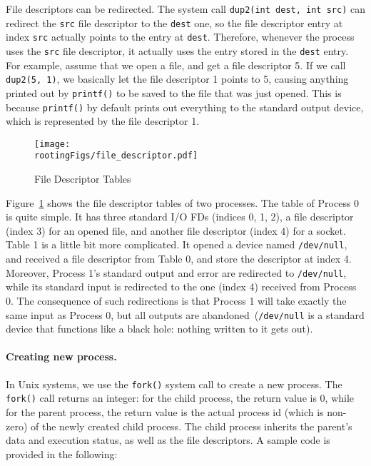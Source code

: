 File descriptors can be redirected. The system call \texttt{dup2(int dest, int src)} can 
redirect the \texttt{src} file descriptor to the \texttt{dest} one, so the file descriptor entry at index
\texttt{src} actually points to the entry at \texttt{dest}. Therefore, whenever   
the process uses the \texttt{src} file descriptor, it actually uses the entry stored in 
the \texttt{dest} entry. For example, assume that we open a file, and get a file descriptor 5. 
If we call \texttt{dup2(5, 1)}, we basically let the file descriptor 1 points to 5, causing 
anything printed out by \texttt{printf()} to be saved to the file that was just opened. This is
because \texttt{printf()} by default prints out everything to the standard output device, which
is represented by the file descriptor 1. 


\begin{figure}[htb]
  \begin{center}
    \texttt{[image: \\rootingFigs/file\_descriptor.pdf]}
  \end{center}
  \caption{File Descriptor Tables}
  \label{fig:rooting:FDTables}
\end{figure}
 

Figure~\ref{fig:rooting:FDTables} shows the file descriptor tables of two processes.
The table of Process 0 is quite simple. It has three
standard I/O FDs (indices 0, 1, 2), a file descriptor (index 3) for an opened file, and 
another file descriptor (index 4) for a socket.
Table 1 is a little bit more complicated. It opened a device named \texttt{/dev/null}, and received a 
file descriptor from Table 0, and store the descriptor at index 4. 
Moreover, Process 1's standard output and error are redirected to \texttt{/dev/null}, while its
standard input is redirected to the one (index 4) received from Process 0. 
The consequence of such redirections is that Process 1 will take exactly the same input 
as Process 0, but all outputs are abandoned~(\texttt{/dev/null} is a standard device that
functions like a black hole: nothing written to it gets out).  


\paragraph{Creating new process.}
In Unix systems, we use the \texttt{fork()} system call to create a new process. 
The \texttt{fork()} call returns an integer: for the child
process, the return value is 0, while for the parent process, the return value
is the actual process id (which is non-zero) of the newly created child process. 
The child process inherits the  parent’s data and execution status, as well as the
file descriptors. A sample code is provided in the following:

